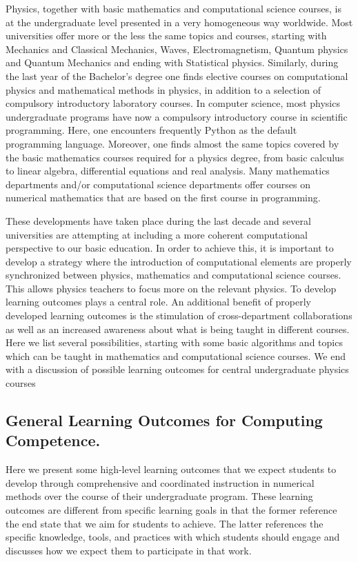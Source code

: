 \documentclass[graybox,envcountchap,sectrefs]{svmult}
\begin{document}
Physics, together with basic mathematics and computational science
courses, is at the undergraduate level presented in a very homogeneous
way worldwide.  Most universities offer more or the less the same
topics and courses, starting with Mechanics and Classical Mechanics,
Waves, Electromagnetism, Quantum physics and Quantum Mechanics and
ending with Statistical physics. Similarly, during the last year of
the Bachelor's degree one finds elective courses on computational
physics and mathematical methods in physics, in addition to a
selection of compulsory introductory laboratory courses. In computer
science, most physics undergraduate programs have now a compulsory
introductory course in scientific programming. Here, one encounters
frequently Python as the default programming language.  Moreover, one
finds almost the same topics covered by the basic mathematics courses
required for a physics degree, from basic calculus to linear algebra,
differential equations and real analysis. Many mathematics departments
and/or computational science departments offer courses on numerical
mathematics that are based on the first course in programming.

These developments have taken place during the last decade and several
universities are attempting at including a more coherent
computational perspective to our basic education. In order to achieve this, it is important to develop a
strategy where the introduction of computational elements are properly
synchronized between physics, mathematics and computational science
courses. This allows physics teachers to focus more on the relevant
physics. To develop learning outcomes plays a central role.  An
additional benefit of properly developed learning outcomes is the
stimulation of cross-department collaborations as well as an increased
awareness about what is being taught in different courses.  Here we
list several possibilities, starting with some basic algorithms and topics which
can be taught in mathematics and computational science courses. We end
with a discussion of possible learning outcomes for central
undergraduate physics courses




\subsection{General Learning Outcomes for Computing Competence.}

Here we present some high-level learning outcomes that we expect
students to develop through comprehensive and coordinated instruction
in numerical methods over the course of their undergraduate
program. These learning outcomes are different from specific learning
goals in that the former reference the end state that we aim for
students to achieve. The latter references the specific knowledge,
tools, and practices with which students should engage and discusses
how we expect them to participate in that work.
\end{document}
